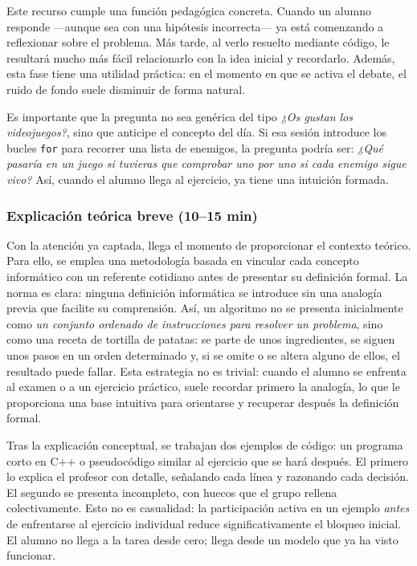 \documentclass[a4paper,12pt]{article}
\begin{document}
Este recurso cumple una función pedagógica concreta. Cuando un alumno responde ---aunque sea con una hipótesis incorrecta--- ya está comenzando a reflexionar sobre el problema.
 Más tarde, al verlo resuelto mediante código, le resultará mucho más fácil relacionarlo con la idea inicial y recordarlo. 
 Además, esta fase tiene una utilidad práctica: en el momento en que se activa el debate, el ruido de fondo suele disminuir de forma natural.

Es importante que la pregunta no sea genérica del tipo \textit{¿Os gustan los
videojuegos?}, sino que anticipe el concepto del día. Si esa sesión introduce
los bucles \texttt{for} para recorrer una lista de enemigos, la pregunta podría
ser: \textit{¿Qué pasaría en un juego si tuvieras que comprobar uno por uno si
cada enemigo sigue vivo?} Así, cuando el alumno llega al ejercicio, ya tiene una
intuición formada.

\subsubsection*{Explicación teórica breve (10--15 min)}

Con la atención ya captada, llega el momento de proporcionar el contexto teórico. Para ello, se emplea una metodología basada en vincular cada concepto informático con un referente cotidiano antes de presentar su definición formal. 
La norma es clara: ninguna definición informática se introduce sin una analogía previa que facilite su comprensión. Así, un algoritmo no se presenta inicialmente como \textit{un conjunto ordenado de instrucciones para resolver un problema},
 sino como una receta de tortilla de patatas: se parte de unos ingredientes, se siguen unos pasos en un orden determinado y, si se omite o se altera alguno de ellos, el resultado puede fallar. Esta estrategia no es trivial: 
 cuando el alumno se enfrenta al examen o a un ejercicio práctico, suele recordar primero la analogía, lo que le proporciona una base intuitiva para orientarse y recuperar después la definición formal.

Tras la explicación conceptual, se trabajan dos ejemplos de código: un programa
corto en C++ o pseudocódigo similar al ejercicio que se hará después. El primero
lo explica el profesor con detalle, señalando cada línea y razonando cada
decisión. El segundo se presenta incompleto, con huecos que el grupo rellena
colectivamente. Esto no es casualidad: la participación activa en un ejemplo
\textit{antes} de enfrentarse al ejercicio individual reduce significativamente
el bloqueo inicial. El alumno no llega a la tarea desde cero; llega desde un
modelo que ya ha visto funcionar.
\end{document}
